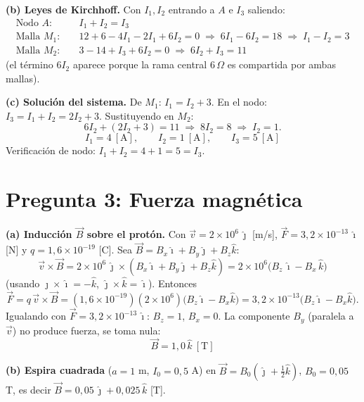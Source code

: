 \documentclass[12pt,letterpaper]{article}
\begin{document}
\noindent\textbf{(b) Leyes de Kirchhoff.} Con $I_1,I_2$ entrando a $A$ e $I_3$ saliendo:
\begin{align*}
    \text{Nodo } A:&\quad I_1 + I_2 = I_3 \\[2pt]
    \text{Malla } M_1:&\quad 12 + 6 - 4I_1 - 2I_1 + 6I_2 = 0 \;\Longrightarrow\; 6I_1 - 6I_2 = 18
        \;\Longrightarrow\; I_1 - I_2 = 3 \\[2pt]
    \text{Malla } M_2:&\quad 3 - 14 + I_3 + 6I_2 = 0 \;\Longrightarrow\; 6I_2 + I_3 = 11
\end{align*}
(el t\'ermino $6I_2$ aparece porque la rama central $6\,\Omega$ es compartida por ambas mallas).

\medskip
\noindent\textbf{(c) Soluci\'on del sistema.} De $M_1$: $I_1 = I_2+3$. En el nodo:
$I_3 = I_1+I_2 = 2I_2+3$. Sustituyendo en $M_2$:
\[
    6I_2 + (2I_2+3) = 11 \;\Longrightarrow\; 8I_2 = 8 \;\Longrightarrow\; I_2 = 1.
\]
\[
    \boxed{I_1 = 4\ [\text{A}],\qquad I_2 = 1\ [\text{A}],\qquad I_3 = 5\ [\text{A}]}
\]
Verificaci\'on de nodo: $I_1+I_2 = 4+1 = 5 = I_3$. \checkmark

\newpage

\section*{Pregunta 3: Fuerza magn\'etica}

\noindent\textbf{(a) Inducci\'on $\vec B$ sobre el prot\'on.} Con $\vec v = 2\times10^{6}\,\hat\jmath$
[m/s], $\vec F = 3{,}2\times10^{-13}\,\hat\imath$ [N] y $q=1{,}6\times10^{-19}$ [C]. Sea
$\vec B = B_x\hat\imath + B_y\hat\jmath + B_z\hat k$:
\[
    \vec v\times\vec B = 2\times10^{6}\,\hat\jmath\times(B_x\hat\imath+B_y\hat\jmath+B_z\hat k)
    = 2\times10^{6}\big(B_z\,\hat\imath - B_x\,\hat k\big)
\]
(usando $\hat\jmath\times\hat\imath=-\hat k$, $\hat\jmath\times\hat k=\hat\imath$). Entonces
\[
    \vec F = q\,\vec v\times\vec B = (1{,}6\times10^{-19})(2\times10^{6})\big(B_z\hat\imath - B_x\hat k\big)
    = 3{,}2\times10^{-13}\big(B_z\hat\imath - B_x\hat k\big).
\]
Igualando con $\vec F = 3{,}2\times10^{-13}\,\hat\imath$: $B_z = 1$, $B_x = 0$. La componente $B_y$
(paralela a $\vec v$) no produce fuerza, se toma nula:
\[
    \boxed{\vec B = 1{,}0\,\hat k\ [\text{T}]}
\]

\vspace{0.3cm}
\noindent\textbf{(b) Espira cuadrada} ($a=1$ m, $I_0=0{,}5$ A) en
$\vec B = B_0\left(\hat\jmath+\tfrac12\hat k\right)$, $B_0=0{,}05$ T, es decir
$\vec B = 0{,}05\,\hat\jmath + 0{,}025\,\hat k$ [T].
\end{document}

